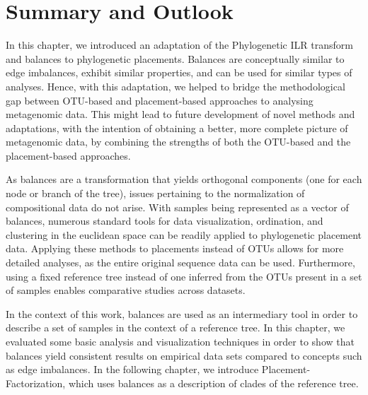 
\section{Summary and Outlook}
\label{ch:Balances:sec:SummaryOutlook}

In this chapter, we introduced an adaptation of the Phylogenetic ILR transform and balances \cite{Silverman2017}
to phylogenetic placements.
Balances are conceptually similar to edge imbalances, exhibit similar properties, 
and can be used for similar types of analyses.
Hence, with this adaptation, we helped to bridge the methodological gap 
between OTU-based and placement-based approaches to analysing metagenomic data.
This might lead to future development of novel methods and adaptations,
with the intention of obtaining a better, more complete picture of metagenomic data,
by combining the strengths of both the OTU-based and the placement-based approaches.

As balances are a transformation that yields orthogonal components (one for each node or branch of the tree),
issues pertaining to the normalization of compositional data do not arise.
With samples being represented as a vector of balances,
numerous standard tools for data visualization, ordination, and clustering in the euclidean space
can be readily applied to phylogenetic placement data.
Applying these methods to placements instead of OTUs allows for more detailed analyses,
as the entire original sequence data can be used.
Furthermore, using a fixed reference tree instead of one inferred from the OTUs present in a set of samples
enables comparative studies across datasets.

In the context of this work, balances are used as an intermediary tool
in order to describe a set of samples in the context of a reference tree.
In this chapter, we evaluated some basic analysis and visualization techniques in order to show
that balances yield consistent results on empirical data sets compared to concepts such as edge imbalances.
In the following chapter, we introduce Placement-Factorization,
which uses balances as a description of clades of the reference tree.




